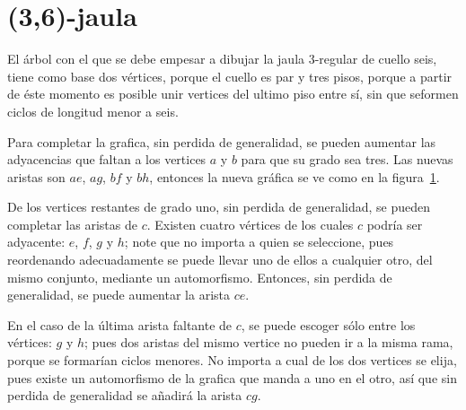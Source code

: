 \documentclass[12pt]{book}
\theoremstyle{definition}
\begin{document}
\section{(3,6)-jaula}


El árbol con el que se debe empesar a dibujar la jaula $3$-regular de
cuello seis, tiene como base dos vértices, porque el cuello es par y
tres pisos, porque a partir de éste momento es posible unir vertices
del ultimo piso entre sí, sin que seformen ciclos de longitud menor a
seis.

Para completar la grafica, sin perdida de generalidad, se pueden
aumentar las adyacencias que faltan a los vertices $a$ y $b$ para que
su grado sea tres. Las nuevas aristas son $ae$, $ag$, $bf$ y $bh$,
entonces la nueva gráfica se ve como en la figura~\ref{arbol(3,6)}.

\begin{figure}
  \centering
  \caption{} \label{arbol(3,6)}
\end{figure}

De los vertices restantes de grado uno, sin perdida de generalidad, se
pueden completar las aristas de $c$. Existen cuatro vértices de los
cuales $c$ podría ser adyacente: $e$,
$f$, $g$ y $h$; note que no importa a quien se seleccione, pues
reordenando adecuadamente se puede llevar uno de ellos a cualquier
otro, del mismo conjunto, mediante un automorfismo. Entonces, sin perdida de generalidad, se
puede aumentar la arista $ce$.

En el caso de la última arista faltante de $c$,
se puede escoger sólo entre los vértices: $g$ y $h$; pues dos aristas del
mismo vertice no pueden ir
a la misma rama, porque se formarían ciclos menores.
No importa a cual de los dos vertices se elija, pues existe
un automorfismo de la grafica que manda a uno en el otro, así que sin
perdida de generalidad se añadirá la arista $cg$. 
\end{document}

